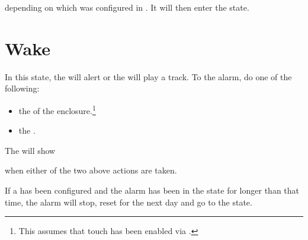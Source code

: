depending on which was configured in \hyperref[Set Alarm]{}. It will then
enter the  state.



\section{Wake} \label{Alarm - Wake} 

In this state, the  will alert or the  will play a track.  To
 the alarm, do one of the following:

\begin{itemize}
  \item {} the  of the enclosure.\footnote{ This assumes that touch
    has been enabled via \hyperref[Touch Settings]{}.}
  \item {} the .
\end{itemize}


The  will show

\begin{figure}[H]
\centering
\end{figure}

when either of the two above actions are taken.

\par\medskip

If a  has been configured and the alarm has been in the 
state for longer than that time, the alarm will stop, reset for the next day
and go to the  state.


